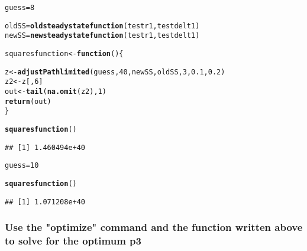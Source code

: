 \documentclass{article}\usepackage[]{graphicx}\usepackage[]{color}
\makeatletter
\newcommand{\hlnum}[1]{\textcolor[rgb]{0.686,0.059,0.569}{#1}}%
\newcommand{\hlstd}[1]{\textcolor[rgb]{0.345,0.345,0.345}{#1}}%
\newcommand{\hlkwa}[1]{\textcolor[rgb]{0.161,0.373,0.58}{\textbf{#1}}}%
\newcommand{\hlkwb}[1]{\textcolor[rgb]{0.69,0.353,0.396}{#1}}%
\newcommand{\hlkwd}[1]{\textcolor[rgb]{0.737,0.353,0.396}{\textbf{#1}}}%
\newenvironment{kframe}{%
 \def\at@end@of@kframe{}%
 \ifinner\ifhmode%
  \def\at@end@of@kframe{\end{minipage}}%
  \begin{minipage}{\columnwidth}%
 \fi\fi%
 \def\FrameCommand##1{\hskip\@totalleftmargin \hskip-\fboxsep
 \colorbox{shadecolor}{##1}\hskip-\fboxsep
     \hskip-\linewidth \hskip-\@totalleftmargin \hskip\columnwidth}%
 \MakeFramed {\advance\hsize-\width
   \@totalleftmargin\z@ \linewidth\hsize
   \@setminipage}}%
 {\par\unskip\endMakeFramed%
 \at@end@of@kframe}
\newenvironment{knitrout}{}{} %
\makeatother
\begin{document}
\begin{knitrout}
\color{fgcolor}\begin{kframe}
\begin{alltt}
\hlstd{guess} \hlkwb{=} \hlnum{8}

\hlstd{oldSS} \hlkwb{=} \hlkwd{oldsteadystatefunction}\hlstd{(testr1, testdelt1)}
\hlstd{newSS} \hlkwb{=} \hlkwd{newsteadystatefunction}\hlstd{(testr1, testdelt1)}

\hlstd{squaresfunction} \hlkwb{<-} \hlkwa{function}\hlstd{()\{}

  \hlstd{z} \hlkwb{<-} \hlkwd{adjustPathlimited}\hlstd{(guess,} \hlnum{40}\hlstd{, newSS, oldSS,} \hlnum{3}\hlstd{,} \hlnum{0.1}\hlstd{,} \hlnum{0.2}\hlstd{)}
  \hlstd{z2} \hlkwb{<-} \hlstd{z[,}\hlnum{6}\hlstd{]}
  \hlstd{out} \hlkwb{<-} \hlkwd{tail}\hlstd{(}\hlkwd{na.omit}\hlstd{(z2),}\hlnum{1}\hlstd{)}
  \hlkwd{return}\hlstd{(out)}
\hlstd{\}}

\hlkwd{squaresfunction}\hlstd{()}
\end{alltt}
\begin{verbatim}
## [1] 1.460494e+40
\end{verbatim}
\begin{alltt}
\hlstd{guess} \hlkwb{=} \hlnum{10}

\hlkwd{squaresfunction}\hlstd{()}
\end{alltt}
\begin{verbatim}
## [1] 1.071208e+40
\end{verbatim}
\end{kframe}
\end{knitrout}

\subsubsection{Use the "optimize" command and the function written above to solve for the optimum p3}
\end{document}
